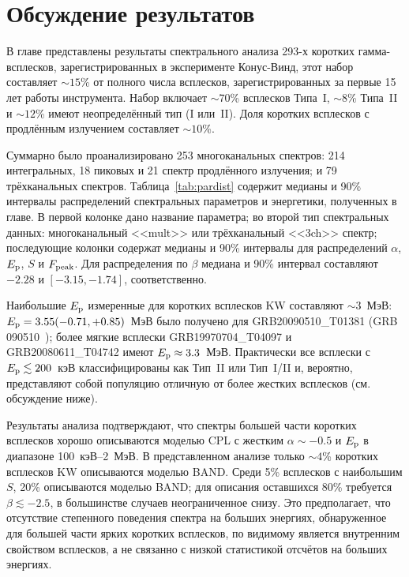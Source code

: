\section{Обсуждение результатов}\label{sec:SUMMARY}
В главе представлены результаты спектрального анализа 293-х коротких гамма-всплесков,
зарегистрированных в эксперименте Конус-Винд, этот набор составляет $\sim 15$\% 
от полного числа всплесков, зарегистрированных за первые 15 лет работы инструмента.
Набор включает $\sim 70$\% всплесков Типа~I, $\sim 8$\% Типа~II и $\sim 12$\%
имеют неопределённый тип (I или~II). Доля коротких всплесков с продлённым 
излучением составляет $\sim 10$\%.

Суммарно было проанализировано 253 многоканальных спектров: 214 интегральных,
18 пиковых и 21 спектр продлённого излучения; и 79 трёхканальных спектров.
Таблица~\ref{tab:pardist} содержит медианы и 90\% интервалы распределений спектральных
параметров и энергетики, полученных в главе. В первой колонке дано название параметра;
во второй тип спектральных данных: многоканальный <<mult>> или трёхканальный <<3ch>> спектр;
последующие колонки содержат медианы и 90\% интервалы для распределений
$\alpha$, $E_{\mathrm{p}}$, $S$ и $F_{\mathrm{peak}}$. Для распределения по $\beta$
медиана и 90\% интервал составляют $-2.28$ и $[-3.15,-1.74]$, соответственно.

Наибольшие $E_{\mathrm{p}}$ измеренные для коротких всплесков KW составляют $\sim 3$~МэВ: 
$E_{\mathrm{p}} = 3.55(-0.71,+0.85)$~МэВ было получено для GRB20090510\_T01381
(GRB 090510~\citep{Ackermann_2010ApJ_716_1178A});
более мягкие всплески GRB19970704\_T04097 и GRB20080611\_T04742 имеют $E_{\mathrm{p}} \approx 3.3$~МэВ.
Практически все всплески с $E_{\mathrm{p}} \lesssim 200$~кэВ классифицированы как Тип~II или Тип~I/II
и, вероятно, представляют собой популяцию отличную от более жестких всплесков (см. обсуждение ниже).



Результаты анализа подтверждают, что спектры большей части коротких всплесков хорошо
описываются моделью CPL с жестким $\alpha \sim -0.5$ и $E_{\mathrm{p}}$ в диапазоне 100~кэВ--2~МэВ.
В представленном анализе только $\sim 4$\% коротких всплесков KW описываются моделью BAND.
Среди 5\%  всплесков с наибольшим $S$, 20\% описываются моделью BAND; для описания 
оставшихся 80\% требуется $\beta \lesssim -2.5$, в большинстве случаев неограниченное снизу.
Это предполагает, что отсутствие степенного поведения спектра на больших энергиях,
обнаруженное для большей части ярких коротких всплесков, по видимому является внутренним
свойством всплесков, а не связанно с низкой статистикой отсчётов на больших энергиях.


